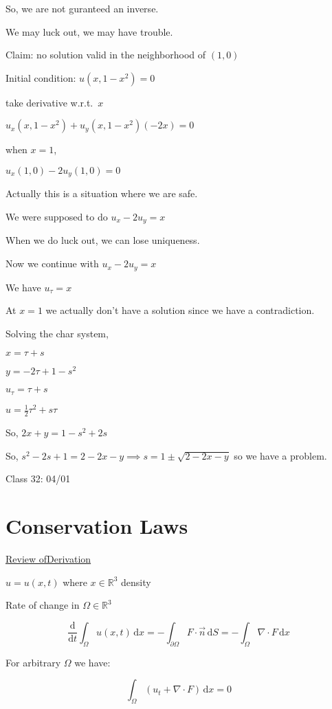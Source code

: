 \documentclass{article}
\theoremstyle{definition}
\begin{document}
So, we are not guranteed an inverse.

We may luck out, we may have trouble.

Claim: no solution valid in the neighborhood of \((1,0)\) 

Initial condition: \(u(x,1-x^2)=0\) 

take derivative w.r.t.\ \(x\) 

\(u_x(x,1-x^2)+u_y(x,1-x^2)(-2x)=0\) 

when \(x=1\),

\(u_x(1,0)-2u_y(1,0)=0\) 

Actually this is a situation where we are safe.

We were supposed to do \(u_x - 2 u_y = x\) 

When we do luck out, we can lose uniqueness.

Now we continue with \(u_x - 2u_y = x\) 

We have \(u_{\tau} = x \)

At \(x=1\) we actually don't have a solution since we have a contradiction.

Solving the char system,

\(x = \tau + s\)

\(y = -2\tau + 1 - s^2\)

\(u_\tau = \tau + s\) 

\(u = \frac{1}{2} \tau ^2 + s\tau\)

So, \(2x+y = 1-s^2 + 2s\) 

So, \(s^2 - 2s + 1 = 2 - 2x - y \implies s = 1 \pm \sqrt{2 - 2x - y} \) so we have a problem.

\hrulefill

Class 32: 04/01

\section*{Conservation Laws}

\underline{Review ofDerivation} 

\(u = u(x,t)\) where \(x\in\mathbb{R} ^3\) density

Rate of change in \(\Omega \in\mathbb{R}^3\)

\[
    \frac{\mathrm{d}}{\mathrm{d}t} \int_{\Omega}^{} u(x,t) \,\mathrm{d}x = - \int_{\partial \Omega}^{} F \cdot \vec{n} \,\mathrm{d}S = - \int_{\Omega}^{} \nabla\cdot F \,\mathrm{d}x 
\]

For arbitrary \(\Omega\) we have:

\[
    \int_{\Omega}^{} \left( u_t + \nabla\cdot F \right)  \,\mathrm{d}x = 0
\]
\end{document}
